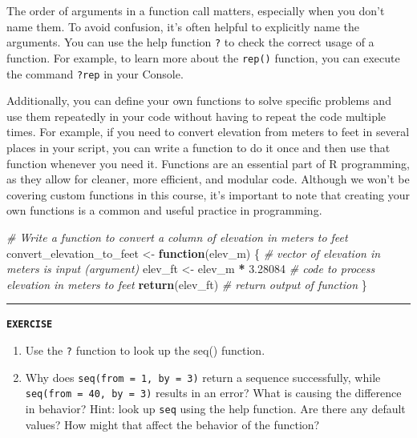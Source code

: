 \documentclass[
]{book}
\newenvironment{Shaded}{\begin{snugshade}}{\end{snugshade}}
\newcommand{\CommentTok}[1]{\textcolor[rgb]{0.56,0.35,0.01}{\textit{#1}}}
\newcommand{\ControlFlowTok}[1]{\textcolor[rgb]{0.13,0.29,0.53}{\textbf{#1}}}
\newcommand{\FloatTok}[1]{\textcolor[rgb]{0.00,0.00,0.81}{#1}}
\newcommand{\FunctionTok}[1]{\textcolor[rgb]{0.13,0.29,0.53}{\textbf{#1}}}
\newcommand{\NormalTok}[1]{#1}
\newcommand{\OtherTok}[1]{\textcolor[rgb]{0.56,0.35,0.01}{#1}}
\newcommand{\SpecialCharTok}[1]{\textcolor[rgb]{0.81,0.36,0.00}{\textbf{#1}}}
\providecommand{\tightlist}{%
  \setlength{\itemsep}{0pt}\setlength{\parskip}{0pt}}
\begin{document}
The order of arguments in a function call matters, especially when you don't name them. To avoid confusion, it's often helpful to explicitly name the arguments. You can use the help function \texttt{?} to check the correct usage of a function. For example, to learn more about the \texttt{rep()} function, you can execute the command \texttt{?rep} in your Console.

Additionally, you can define your own functions to solve specific problems and use them repeatedly in your code without having to repeat the code multiple times. For example, if you need to convert elevation from meters to feet in several places in your script, you can write a function to do it once and then use that function whenever you need it. Functions are an essential part of R programming, as they allow for cleaner, more efficient, and modular code. Although we won't be covering custom functions in this course, it's important to note that creating your own functions is a common and useful practice in programming.

\begin{Shaded}
\begin{Highlighting}[]
\CommentTok{\# Write a function to convert a column of elevation in meters to feet}
\NormalTok{convert\_elevation\_to\_feet }\OtherTok{\textless{}{-}} \ControlFlowTok{function}\NormalTok{(elev\_m) \{ }\CommentTok{\# vector of elevation in meters is input (argument)}
\NormalTok{  elev\_ft }\OtherTok{\textless{}{-}}\NormalTok{ elev\_m }\SpecialCharTok{*} \FloatTok{3.28084} \CommentTok{\# code to process elevation in meters to feet}
  \FunctionTok{return}\NormalTok{(elev\_ft) }\CommentTok{\# return output of function}
\NormalTok{\}}
\end{Highlighting}
\end{Shaded}

\begin{center}\rule{0.5\linewidth}{0.5pt}\end{center}

\textbf{\texttt{EXERCISE}}

\begin{enumerate}
\def\labelenumi{\arabic{enumi}.}
\tightlist
\item
  Use the \texttt{?} function to look up the seq() function.
\item
  Why does \texttt{seq(from\ =\ 1,\ by\ =\ 3)} return a sequence successfully, while \texttt{seq(from\ =\ 40,\ by\ =\ 3)} results in an error? What is causing the difference in behavior? Hint: look up \texttt{seq} using the help function. Are there any default values? How might that affect the behavior of the function?
\end{enumerate}
\end{document}
